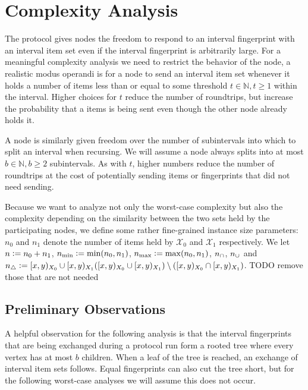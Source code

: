 \section{Complexity Analysis}
\label{set-reconciliation-complexity}

The protocol gives nodes the freedom to respond to an interval fingerprint with an interval item set even if the interval fingerprint is arbitrarily large. For a meaningful complexity analysis we need to restrict the behavior of the node, a realistic modus operandi is for a node to send an interval item set whenever it holds a number of items less than or equal to some threshold $t \in \mathbb{N}, t \geq 1$ within the interval. Higher choices for $t$ reduce the number of roundtrips, but increase the probability that a items is being sent even though the other node already holds it.

A node is similarly given freedom over the number of subintervals into which to split an interval when recursing. We will assume a node always splits into at most $b \in \mathbb{N}, b \geq 2$ subintervals. As with $t$, higher numbers reduce the number of roundtrips at the cost of potentially sending items or fingerprints that did not need sending.

Because we want to analyze not only the worst-case complexity but also the complexity depending on the similarity between the two sets held by the participating nodes, we define some rather fine-grained instance size parameters: $n_0$ and $n_1$ denote the number of items held by $\mathcal{X}_0$ and $\mathcal{X}_1$ respectively. We let $n \vcentcolon= n_0 + n_1$, $n_{\min} \vcentcolon= \min(n_0, n_1)$, $n_{\max} \vcentcolon= \max(n_0, n_1)$, $n_{\cap} \def \abs{\interval{x}{y}{X_0} \cap \interval{x}{y}{X_1}}$, $n_{\cup} \def \abs{\interval{x}{y}{X_0} \cup \interval{x}{y}{X_1}}$ and $n_{\triangle} \defeq \abs{(\interval{x}{y}{X_0} \cup \interval{x}{y}{X_1}) \setminus (\interval{x}{y}{X_0} \cap \interval{x}{y}{X_1})}$. TODO remove those that are not needed

\subsection{Preliminary Observations}

A helpful observation for the following analysis is that the interval fingerprints that are being exchanged during a protocol run form a rooted tree where every vertex has at most $b$ children. When a leaf of the tree is reached, an exchange of interval item sets follows. Equal fingerprints can also cut the tree short, but for the following worst-case analyses we will assume this does not occur.

